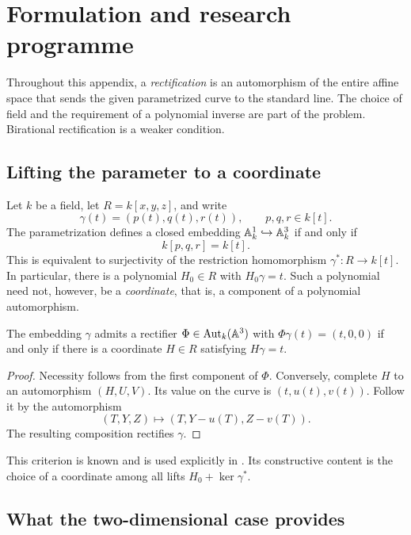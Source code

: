 \section{Formulation and research programme}\label{sec:program}

Throughout this appendix, a \emph{rectification} is an automorphism
of the entire affine space that sends the given parametrized curve
to the standard line. The choice of field and the requirement of a
polynomial inverse are part of the problem. Birational rectification
is a weaker condition.

\subsection{Lifting the parameter to a coordinate}

Let $k$ be a field, let $R=k[x,y,z]$, and write
\[
 \gamma(t)=(p(t),q(t),r(t)),\qquad p,q,r\in k[t].
\]
The parametrization defines a closed embedding
${\mathbb A}^1_k\hookrightarrow{\mathbb A}^3_k$ if and only if
\begin{equation}\label{eq:closed-embedding}
 k[p,q,r]=k[t].
\end{equation}
This is equivalent to surjectivity of the restriction homomorphism
$\gamma^*:R\to k[t]$. In particular, there is a polynomial $H_0\in R$
with $H_0\gamma=t$. Such a polynomial need not, however, be a
\emph{coordinate}, that is, a component of a polynomial automorphism.

\begin{lemma}\label{lem:coordinate-lift}
The embedding $\gamma$ admits a rectifier $\Phi\in\operatorname{Aut}_k({\mathbb A}^3)$
with $\Phi\gamma(t)=(t,0,0)$ if and only if there is a coordinate
$H\in R$ satisfying $H\gamma=t$.
\end{lemma}
\begin{proof}
Necessity follows from the first component of $\Phi$. Conversely,
complete $H$ to an automorphism $(H,U,V)$. Its value on the curve
is $(t,u(t),v(t))$. Follow it by the automorphism
\[
 (T,Y,Z)\longmapsto(T,Y-u(T),Z-v(T)).
\]
The resulting composition rectifies $\gamma$.
\end{proof}
This criterion is known and is used explicitly in
\cite[Lemma~1]{Lewis2024}. Its constructive content is the choice
of a coordinate among all lifts $H_0+\ker\gamma^*$.

\subsection{What the two-dimensional case provides}

